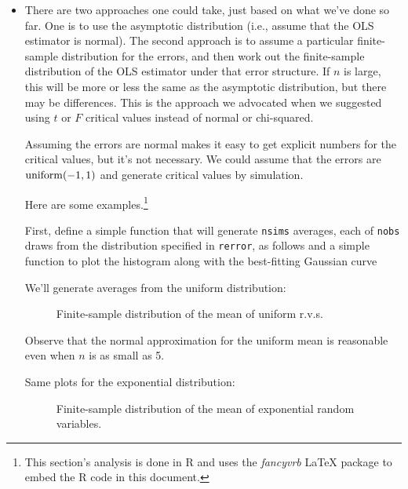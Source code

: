 \begin{itemize}[leftmargin=0pt]

\item There are two approaches one could take, just based on what
  we've done so far.  One is to use the asymptotic distribution (i.e.,
  assume that the OLS estimator is normal).  The second approach is to
  assume a particular finite-sample distribution for the errors, and
  then work out the finite-sample distribution of the OLS estimator
  under that error structure.  If $n$ is large, this will be more or
  less the same as the asymptotic distribution, but there may be
  differences.  This is the approach we advocated when we suggested
  using $t$ or $F$ critical values instead of normal or chi-squared.

  Assuming the errors are normal makes it easy to get explicit numbers
  for the critical values, but it's not necessary.  We could assume
  that the errors are $\operatorname{uniform}(-1,1)$ and generate critical values by
  simulation.

  Here are some examples.\footnote{This section's analysis is done in
    R \citep{R} and uses the \emph{fancyvrb} LaTeX package
    \citep{Zan98} to embed the R code in this document.}

  First, define a simple function that will generate \verb|nsims|
  averages, each of \verb|nobs| draws from the distribution
  specified in \verb|rerror|, as follows
  \renewcommand*\FancyVerbStartString{## block 1}
  and a simple function to plot the histogram along with the
  best-fitting Gaussian curve
  \renewcommand*\FancyVerbStartString{## block 2}

  We'll generate averages from the uniform distribution:
  \begin{figure*}
    \caption{Finite-sample distribution of the mean of uniform r.v.s.}
  \end{figure*}

  Observe that the normal approximation for the uniform mean is
  reasonable even when $n$ is as small as 5.

  Same plots for the exponential distribution:
  \begin{figure*}
    \caption{Finite-sample distribution of the mean of exponential random
      variables.}
  \end{figure*}


\end{itemize}
